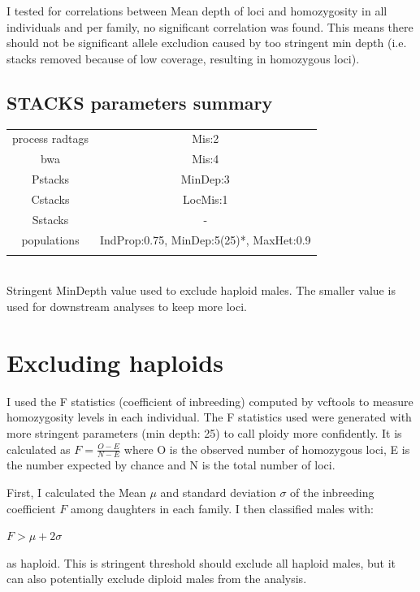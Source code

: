 \documentclass[10pt,a4paper]{report}
\begin{document}
I tested for correlations between Mean depth of loci and homozygosity in all individuals and per family, no significant correlation was found. This means there should not be significant allele excludion caused by too stringent min depth (i.e. stacks removed because of low coverage, resulting in homozygous loci).

\section{STACKS parameters summary}
\begin{table}[h!]
\begin{tabular}{c|c}
process radtags & Mis:2\\
bwa & Mis:4\\
Pstacks & MinDep:3\\
Cstacks & LocMis:1\\
Sstacks & -\\
populations & IndProp:0.75, MinDep:5(25)*, MaxHet:0.9\\
\vspace{5px}
\end{tabular}
\\
 \footnotesize * Stringent MinDepth value used to exclude haploid males. The smaller value is used for downstream analyses to keep more loci.
\end{table}

\FloatBarrier

\chapter{Excluding haploids}

I used the F statistics (coefficient of inbreeding) computed by vcftools to measure homozygosity levels in each individual. The F statistics used were generated with more stringent parameters (min depth: 25) to call ploidy more confidently. It is calculated as $F = \frac{O-E}{N-E}$ where O is the observed number of homozygous loci, E is the number expected by chance and N is the total number of loci.

First, I calculated the Mean $\mu$ and standard deviation $\sigma$ of the inbreeding coefficient $F$ among daughters in each family. I then classified males with:
\\
\begin{center}
 $F > \mu + 2\sigma $  \\
\end{center}

 as haploid. This is stringent threshold should exclude all haploid males, but it can also potentially exclude diploid males from the analysis.
\end{document}

